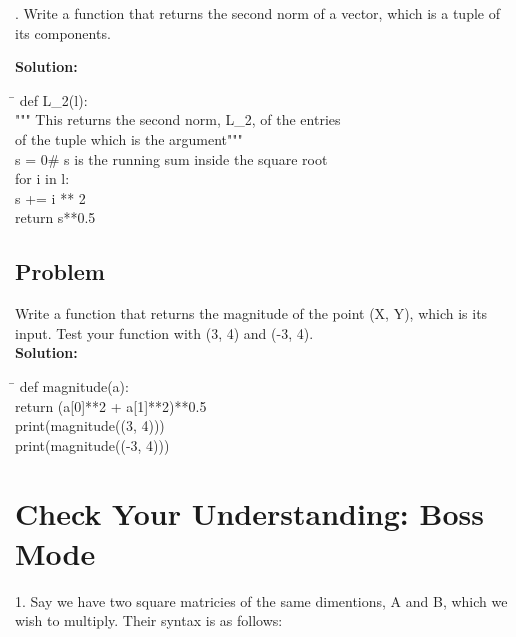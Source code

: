 \documentclass{article}
\newcommand{\icode}[1]{{\ttfamily #1}}
\newenvironment{code}{\begin{tcolorbox}\ttfamily}{\end{tcolorbox}}
\begin{document}
. Write a function that returns the second norm of a vector, which is a tuple of its components.

\noindent \textbf{Solution:}
\begin{code}
	\begin{tabbing}
		\hspace{7 cm} \= \hspace{7 cm} \kill
		def L\_2(l):\\
		\hspace{2 em}""" This returns the second norm, L\_2, of the entries \\
		\hspace{2 em}of the tuple which is the argument"""\\
		\hspace{2 em}s = 0\>\# s is the running sum inside the square root\\
		\hspace{2 em}for i in l:\\
		\hspace{4 em}s += i ** 2\\
		\hspace{2 em}return s**0.5
	\end{tabbing}
\end{code}
\subsection{Problem}
\noindent Write a function that returns the magnitude of the point \icode{(X, Y)}, which is its input. Test your function with \icode{(3, 4)} and \icode{(-3, 4)}.\\
\textbf{Solution:}

\begin{code}
	\begin{tabbing}
		\hspace{5 cm} \= \hspace{5 cm} \kill
		def magnitude(a):\\
		\hspace{2 em}return (a[0]**2 + a[1]**2)**0.5\\
		print(magnitude((3, 4)))\\
		print(magnitude((-3, 4)))
	\end{tabbing}
\end{code}



\newpage
\section{Check Your Understanding: Boss Mode}
1. Say we have two square matricies of the same dimentions, \icode{A} and \icode{B}, which we wish to multiply. Their syntax is as follows:
\end{document}
